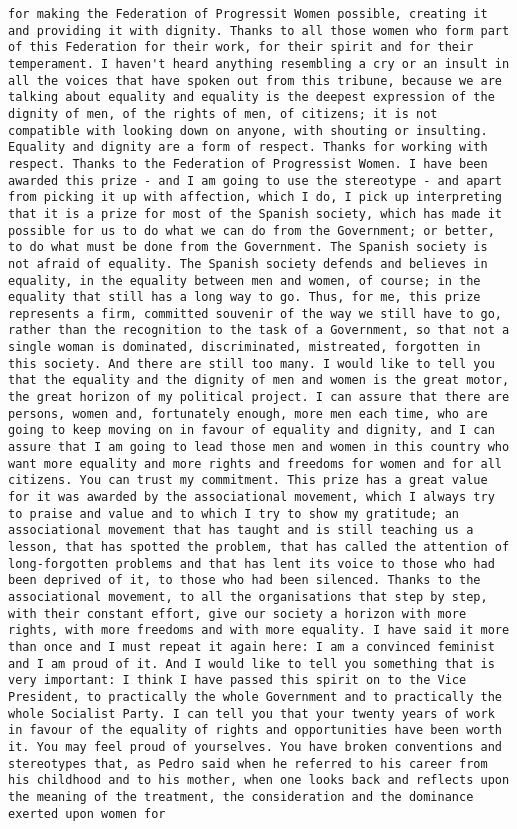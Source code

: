 \documentclass[
]{article}
\begin{document}
\begin{verbatim}
for making the Federation of Progressit Women possible, creating it and providing it with dignity. Thanks to all those women who form part of this Federation for their work, for their spirit and for their temperament. I haven't heard anything resembling a cry or an insult in all the voices that have spoken out from this tribune, because we are talking about equality and equality is the deepest expression of the dignity of men, of the rights of men, of citizens; it is not compatible with looking down on anyone, with shouting or insulting. Equality and dignity are a form of respect. Thanks for working with respect. Thanks to the Federation of Progressist Women. I have been awarded this prize - and I am going to use the stereotype - and apart from picking it up with affection, which I do, I pick up interpreting that it is a prize for most of the Spanish society, which has made it possible for us to do what we can do from the Government; or better, to do what must be done from the Government. The Spanish society is not afraid of equality. The Spanish society defends and believes in equality, in the equality between men and women, of course; in the equality that still has a long way to go. Thus, for me, this prize represents a firm, committed souvenir of the way we still have to go, rather than the recognition to the task of a Government, so that not a single woman is dominated, discriminated, mistreated, forgotten in this society. And there are still too many. I would like to tell you that the equality and the dignity of men and women is the great motor, the great horizon of my political project. I can assure that there are persons, women and, fortunately enough, more men each time, who are going to keep moving on in favour of equality and dignity, and I can assure that I am going to lead those men and women in this country who want more equality and more rights and freedoms for women and for all citizens. You can trust my commitment. This prize has a great value for it was awarded by the associational movement, which I always try to praise and value and to which I try to show my gratitude; an associational movement that has taught and is still teaching us a lesson, that has spotted the problem, that has called the attention of long-forgotten problems and that has lent its voice to those who had been deprived of it, to those who had been silenced. Thanks to the associational movement, to all the organisations that step by step, with their constant effort, give our society a horizon with more rights, with more freedoms and with more equality. I have said it more than once and I must repeat it again here: I am a convinced feminist and I am proud of it. And I would like to tell you something that is very important: I think I have passed this spirit on to the Vice President, to practically the whole Government and to practically the whole Socialist Party. I can tell you that your twenty years of work in favour of the equality of rights and opportunities have been worth it. You may feel proud of yourselves. You have broken conventions and stereotypes that, as Pedro said when he referred to his career from his childhood and to his mother, when one looks back and reflects upon the meaning of the treatment, the consideration and the dominance exerted upon women for 
\end{verbatim}
\end{document}
